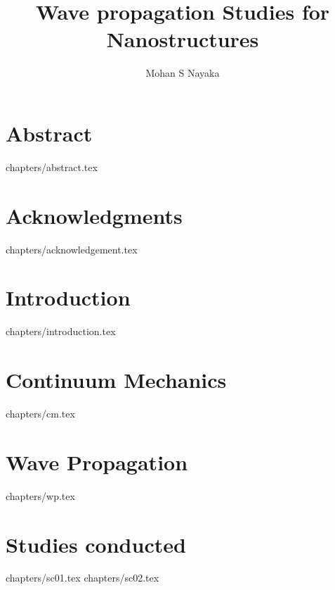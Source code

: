 \documentclass[12pt,a4paper,oneside,openright,titlepage]{report}
\author{Mohan S Nayaka}
\title{Wave propagation Studies for Nanostructures}
\begin{document}
\maketitle
\tableofcontents
\chapter* {Abstract}
 {chapters/abstract.tex}
\chapter* {Acknowledgments}
 {chapters/acknowledgement.tex}
\chapter {Introduction}
 {chapters/introduction.tex}
\chapter {Continuum Mechanics}
 {chapters/cm.tex}
\chapter {Wave Propagation}
 {chapters/wp.tex}
\chapter {Studies conducted}
 {chapters/sc01.tex}
 {chapters/sc02.tex}


\end{document}
